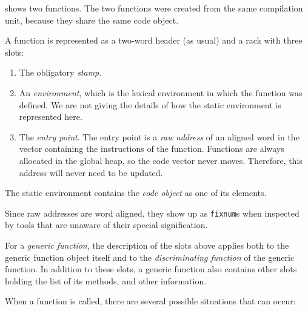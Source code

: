  shows two functions.  The two
functions were created from the same compilation unit, because they
share the same code object. 

A function is represented as a two-word header (as usual) and a
rack with three slots:

\begin{enumerate}
\item The obligatory \emph{stamp}.
\item An \emph{environment}, which is the lexical environment in which
  the function was defined.  We are not giving the details of how the
  static environment is represented here.
\item The \emph{entry point}.  The entry
  point is a \emph{raw address} of an aligned word in the vector
  containing the instructions of the function.  Functions are always
  allocated in the global heap, so the code vector never moves.
  Therefore, this address will never need to be updated.
\end{enumerate}

The static environment contains the \emph{code object} as one of its
elements.

Since raw addresses are word aligned, they show up as \texttt{fixnum}s
when inspected by tools that are unaware of their special
signification.

For a \emph{generic function}, the description of the slots above
applies both to the generic function object itself and to the
\emph{discriminating function} of the generic function.  In addition
to these slots, a generic function also contains other slots holding
the list of its methods, and other information.

When a function is called, there are several possible situations that
can occur:

